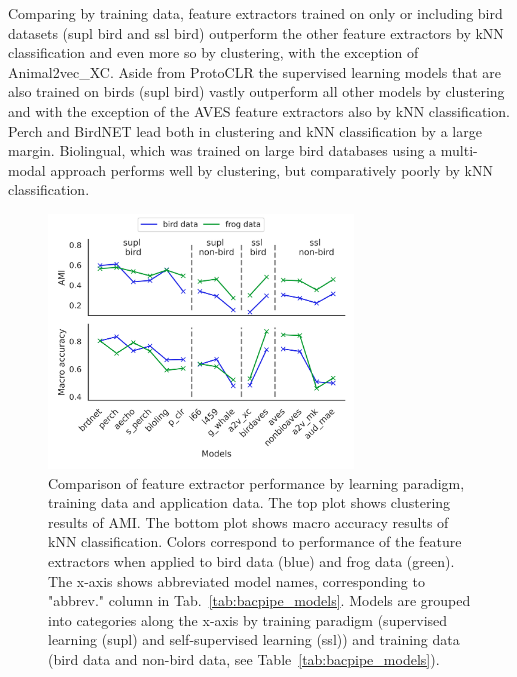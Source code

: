 Comparing by training data, feature extractors trained on only or including bird datasets (supl bird and ssl bird) outperform the other feature extractors by kNN classification and even more so by clustering, with the exception of Animal2vec\_XC.
Aside from ProtoCLR the supervised learning models that are also trained on birds (supl bird) vastly outperform all other models by clustering and with the exception of the AVES feature extractors also by kNN classification.
Perch and BirdNET lead both in clustering and kNN classification by a large margin.
Biolingual, which was trained on large bird databases using a multi-modal approach performs well by clustering, but comparatively poorly by kNN classification.

\begin{figure}[ht]
    \centerline{{
    \includegraphics[width=8.1cm]{Sections/imgs/clust_and_class_lineplots.png}}}
    \caption{Comparison of feature extractor performance by learning paradigm, training data and application data. 
    The top plot shows clustering results of AMI.
    The bottom plot shows macro accuracy results of kNN classification. 
    Colors correspond to performance of the feature extractors when applied to bird data (blue) and frog data (green).
    The x-axis shows abbreviated model names, corresponding to "abbrev." column in Tab.~\ref{tab:bacpipe_models}. 
    Models are grouped into categories along the x-axis by training paradigm (supervised learning (supl) and self-supervised learning (ssl)) and training data (bird data and non-bird data, see Table~\ref{tab:bacpipe_models}).}
    \label{fig:orig_vs_ump}
\end{figure}


